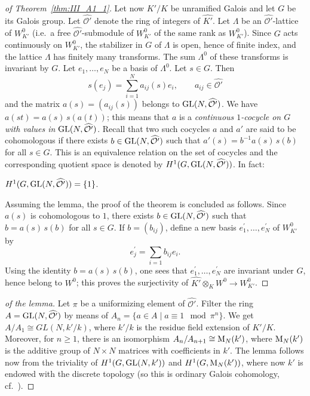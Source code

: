 \begin{subappendices}
\begin{proof}[ of Theorem~\ref{thm:III_A1_1}]
	Let now $K'/K$ be unramified Galois and let $G$ be its Galois group.
	Let $\widehat{\mathcal{O}'}$ denote the ring of integers of
	$\widehat{K'}$. Let $\Lambda$ be an $\widehat{\mathcal{O}'}$-lattice of
	$W_{K'}^0$ (i.e.\ a free $\widehat{\mathcal{O}'}$-submodule of
	$W_{K'}^0$ of the same rank as $W_{K'}^0$). Since $G$ acts continuously
	on $W_{K'}^0$, the stabilizer in $G$ of $\Lambda$ is open, hence of
	finite index, and the lattice $\Lambda$ has finitely many transforms.
	\dpage
	The sum $\Lambda^0$ of these transforms is invariant by $G$. Let $e_1,
	\dots, e_N$ be a basis of $\Lambda^0$. Let $s \in G$.  Then
	\[
		s(e_j) = \sum_{i=1}^{N} a_{ij}(s) e_i,
		\qquad a_{ij} \in \widehat{\mathcal{O}'}
	\]
	and the matrix $a(s) = (a_{ij}(s))$ belongs to $\operatorname{GL}(N,
	\widehat{\mathcal{O}'})$. We have $a(st) = a(s) \, s(a(t))$; this means
	that $a$ is a \emph{continuous $1$-cocycle on $G$ with values in
	$\operatorname{GL}(N, \widehat{\mathcal{O}'})$}. Recall that two such cocycles $a$
	and $a'$ are said to be cohomologous if there exists $b \in \operatorname{GL}(N,
	\widehat{\mathcal{O}'})$ such that $a'(s) = b^{-1} a(s) \, s(b)$ for
	all $s \in G$. This is an equivalence relation on the set of cocycles
	and the corresponding quotient space is denoted by $H^1(G, \operatorname{GL}(N,
	\widehat{\mathcal{O}'}))$. In fact:
	\begin{lem}
		$H^1(G, \operatorname{GL}(N, \widehat{\mathcal{O}'})) = \{ 1 \}$.
	\end{lem}
	Assuming the lemma, the proof of the theorem is concluded as follows.
	Since $a(s)$ is cohomologous to $1$, there exists $b \in \operatorname{GL}(N,
	\widehat{\mathcal{O}'})$ such that $b = a(s) \, s(b)$ for all $s \in
	G$. If $b = (b_{ij})$, define a new basis $e_1^\prime, \dots,
	e_N^\prime$ of $W^0_{K'}$ by
	\[
		e_j^\prime = \sum_{i=1} b_{ij} e_i.
	\]
	Using the identity $b = a(s) \, s(b)$, one sees that $e_1^\prime,
	\dots, e_N^\prime$ are invariant under $G$, hence belong to $W^0$; this
	proves the surjectivity of $\widehat{K'} \otimes_K W^0 \to W_{K'}^0$.
\end{proof}

\begin{proof}[ of the lemma]
	Let $\pi$ be a uniformizing element of $\widehat{\mathcal{O}'}$. Filter
	\dpage
	the ring $A = \operatorname{GL}(N, \widehat{\mathcal{O}'})$ by means of $A_n = \{a
	\in A \mid a \equiv 1 \mod{\pi^n} \}$. We get $A/A_1 \cong GL(N, k' /
	k)$, where $k' / k$ is the residue field extension of $K' / K$.
	Moreover, for $n \ge 1$, there is an isomorphism \label{errata:An+k}
	$A_n / A_{n+1} \cong \operatorname{M}_N(k')$, where $\operatorname{M}_N(k')$ is the additive
	group of $N \times N$ matrices with coefficients in $k'$. The lemma
	follows now from the triviality of $H^1(G, \operatorname{GL}(N, k'))$ and $H^1(G,
	\operatorname{M}_N(k'))$, where now $k'$ is endowed with the discrete topology (so
	this is ordinary Galois cohomology, cf.\ \cite[158-159]{29}).
\end{proof}


\end{subappendices}
